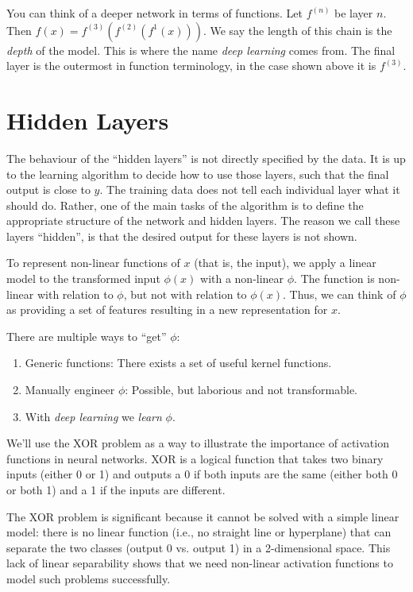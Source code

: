 You can think of a deeper network in terms of functions. Let $f^{(n)}$ be layer $n$. Then $f(x) = f^{(3)}(f^{(2)}(f^{1}(x)))$. We say the length of this chain is the \textit{depth} of the model. This is where the name \textit{deep learning} comes from. The final layer is the outermost in function terminology, in the case shown above it is $f^{(3)}$.

\section{Hidden Layers}%
\label{sec:label}

The behaviour of the ``hidden layers'' is not directly specified by the data. It is up to the learning algorithm to decide how to use those layers, such that the final output is close to $y$. The training data does not tell each individual layer what it should do. Rather, one of the main tasks of the algorithm is to define the appropriate structure of the network and hidden layers. The reason we call these layers ``hidden'', is that the desired output for these layers is not shown.

To represent non-linear functions of $x$ (that is, the input), we apply a linear model to the transformed input \(\phi(x)\) with  a non-linear \(\phi\). The function is non-linear with relation to \(\phi\), but not with relation to \(\phi(x)\). Thus, we can think of \(\phi\) as providing a set of features resulting in a new representation for $x$.

There are multiple ways to ``get'' \(\phi\):
\begin{enumerate}
	\item Generic functions: There exists a set of useful kernel functions.
	\item Manually engineer \(\phi\): Possible, but laborious and not transformable.
	\item With \textit{deep learning} we \textit{learn} \(\phi\).
\end{enumerate}

We'll use the XOR problem as a way to illustrate the importance of activation functions in neural networks. XOR is a logical function that takes two binary inputs (either 0 or 1) and outputs a 0 if both inputs are the same (either both 0 or both 1) and a 1 if the inputs are different.

The XOR problem is significant because it cannot be solved with a simple linear model: there is no linear function (i.e., no straight line or hyperplane) that can separate the two classes (output 0 vs. output 1) in a 2-dimensional space. This lack of linear separability shows that we need non-linear activation functions to model such problems successfully.

